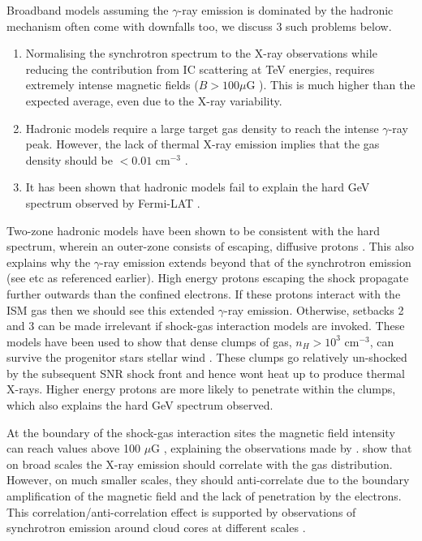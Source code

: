\documentclass[12pt,a4paper]{article}
\begin{document}
Broadband models assuming the $\gamma$-ray emission is dominated by the hadronic mechanism often come with downfalls too, we discuss 3 such problems below.
\begin{enumerate}
\item Normalising the synchrotron spectrum to the X-ray observations while reducing the contribution from IC scattering at TeV energies, requires extremely intense magnetic fields ($B > 100 \mu$G \citep{2008ApJ...685..988T}). 
This is much higher than the expected average, even due to the X-ray variability.
\item Hadronic models require a large target gas density to reach the intense $\gamma$-ray peak. 
However, the lack of thermal X-ray emission implies that the gas density should be $< 0.01$ cm$^{-3}$ \citep{2010ApJ...712..287E}.
\item It has been shown that hadronic models fail to explain the hard GeV spectrum observed by Fermi-LAT \citep{2011ApJ...734...28A}.
\end{enumerate}
Two-zone hadronic models have been shown to be consistent with the hard spectrum, wherein an outer-zone consists of escaping, diffusive protons \citep{2016ApJ...821...43Z}.
This also explains why the $\gamma$-ray emission extends beyond that of the synchrotron emission (see \cite{2009A&A...505..157A} etc as referenced earlier).
High energy protons escaping the shock propagate further outwards than the confined electrons.
If these protons interact with the ISM gas then we should see this extended $\gamma$-ray emission.
Otherwise, setbacks 2 and 3 can be made irrelevant if shock-gas interaction models are invoked.
These models have been used to show that dense clumps of gas, $n_H > 10^3$ cm$^{-3}$, can survive the progenitor stars stellar wind \citep{2010ApJ...724...59S,2012ApJ...744...71I,2018arXiv180410579C}. 
These clumps go relatively un-shocked by the subsequent SNR shock front and hence wont heat up to produce thermal X-rays.
Higher energy protons are more likely to penetrate within the clumps, which also explains the hard GeV spectrum observed.

At the boundary of the shock-gas interaction sites the magnetic field intensity can reach values above 100 $\mu$G \citep{2012ApJ...744...71I,2014MNRAS.445L..70G}, explaining the observations made by \cite{2007Natur.449..576U}.
\cite{2012ApJ...744...71I,2013ApJ...778...59S} show that on broad scales the X-ray emission should correlate with the gas distribution. 
However, on much smaller scales, they should anti-correlate due to the boundary amplification of the magnetic field and the lack of penetration by the electrons.
This correlation/anti-correlation effect is supported by observations of synchrotron emission around cloud cores at different scales \citep{2010ApJ...724...59S,2013ApJ...778...59S,2015ApJ...799..175S}.
\end{document}
